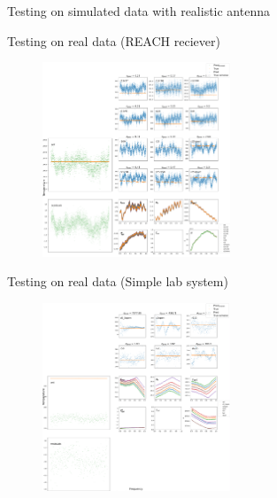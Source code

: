 \documentclass[aspectratio=169]{beamer}
\begin{document}
\begin{frame}{Testing on simulated data with realistic antenna}
	\begin{figure}
		\centering
		
	\end{figure}
\end{frame}

\begin{frame}{Testing on real data (REACH reciever)}
	\begin{figure}
		\centering
		\includegraphics[width=0.5\textwidth]{nima_best.png}
	\end{figure}
\end{frame}

\begin{frame}{Testing on real data (Simple lab system)}
	\begin{figure}
		\centering
		\includegraphics[width=0.5\textwidth]{kaan_best.png}
	\end{figure}
\end{frame}
\end{document}
